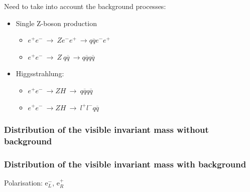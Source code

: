 \documentclass{beamer}
\begin{document}
\begin{frame}
{{\begin{block}{Need to take into account the background processes:}
\begin{itemize}
                        \vspace{-0.2cm}
                    \item Single Z-boson production
                        \vspace{-0.1cm}
                        \begin{itemize}
                            \item $e^+e^- \ \rightarrow \ Z e^-e^+ \ \rightarrow q\overline{q}e^-e^+$
                            \item $e^+e^- \ \rightarrow \ Z \ q\overline{q} \ \rightarrow q\overline{q}q\overline{q}$
                        \end{itemize}
                        \vspace{-0.2cm}
                    \item Higgsstrahlung:
                        \vspace{-0.1cm}
                        \begin{itemize}
                            \item $e^+e^- \ \rightarrow ZH \ \rightarrow \ q\overline{q}q\overline{q}$ 
                            \item $e^+e^- \ \rightarrow ZH \ \rightarrow \ l^+ l^- q \overline{q}$
                        \end{itemize}
                \end{itemize}
            \end{block}
    }}
\end{frame}

\begin{frame}
    \frametitle<1>{Distribution of the visible invariant mass without background}
    \frametitle<2>{Distribution of the visible invariant mass with background}
    \begin{center}
        \centering
        Polarisation: e$^-_L$, e$^+_R$%
    \end{center}
\end{frame}
\end{document}
